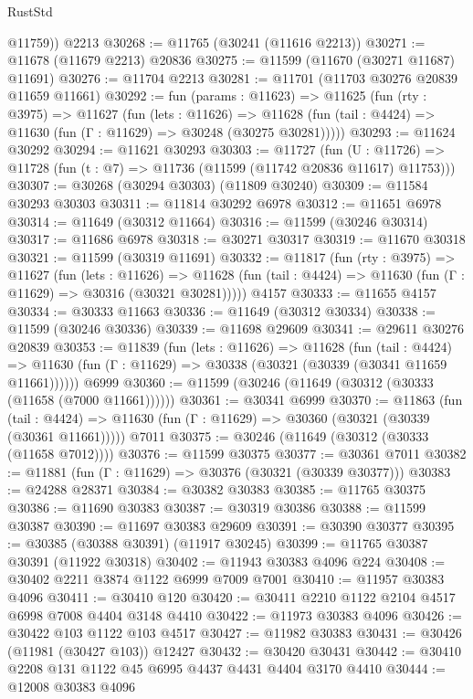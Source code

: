 \begin{lexlean}{RustStd}
\begin{coremodule}
        @11759))
    @2213
@30268 := @11765 (@30241 (@11616 @2213))
@30271 := @11678 (@11679 @2213) @20836
@30275 := @11599 (@11670 (@30271 @11687) @11691)
@30276 := @11704 @2213
@30281 := @11701 (@11703 @30276 @20839 @11659 @11661)
@30292 := fun (params : @11623) =>
  @11625
    (fun (rty : @3975) =>
    @11627
      (fun (lets : @11626) =>
      @11628 (fun (tail : @4424) => @11630 (fun (Γ : @11629) => @30248 (@30275 @30281)))))
@30293 := @11624 @30292
@30294 := @11621 @30293
@30303 := @11727
    (fun (U : @11726) => @11728 (fun (t : @7) => @11736 (@11599 (@11742 @20836 @11617) @11753)))
@30307 := @30268 (@30294 @30303) (@11809 @30240)
@30309 := @11584 @30293 @30303
@30311 := @11814 @30292 @6978
@30312 := @11651 @6978
@30314 := @11649 (@30312 @11664)
@30316 := @11599 (@30246 @30314)
@30317 := @11686 @6978
@30318 := @30271 @30317
@30319 := @11670 @30318
@30321 := @11599 (@30319 @11691)
@30332 := @11817
    (fun (rty : @3975) =>
    @11627
      (fun (lets : @11626) =>
      @11628 (fun (tail : @4424) => @11630 (fun (Γ : @11629) => @30316 (@30321 @30281)))))
    @4157
@30333 := @11655 @4157
@30334 := @30333 @11663
@30336 := @11649 (@30312 @30334)
@30338 := @11599 (@30246 @30336)
@30339 := @11698 @29609
@30341 := @29611 @30276 @20839
@30353 := @11839
    (fun (lets : @11626) =>
    @11628
      (fun (tail : @4424) =>
      @11630 (fun (Γ : @11629) => @30338 (@30321 (@30339 (@30341 @11659 @11661))))))
    @6999
@30360 := @11599 (@30246 (@11649 (@30312 (@30333 (@11658 (@7000 @11661))))))
@30361 := @30341 @6999
@30370 := @11863
    (fun (tail : @4424) => @11630 (fun (Γ : @11629) => @30360 (@30321 (@30339 (@30361 @11661)))))
    @7011
@30375 := @30246 (@11649 (@30312 (@30333 (@11658 @7012))))
@30376 := @11599 @30375
@30377 := @30361 @7011
@30382 := @11881 (fun (Γ : @11629) => @30376 (@30321 (@30339 @30377)))
@30383 := @24288 @28371
@30384 := @30382 @30383
@30385 := @11765 @30375
@30386 := @11690 @30383
@30387 := @30319 @30386
@30388 := @11599 @30387
@30390 := @11697 @30383 @29609
@30391 := @30390 @30377
@30395 := @30385 (@30388 @30391) (@11917 @30245)
@30399 := @11765 @30387 @30391 (@11922 @30318)
@30402 := @11943 @30383 @4096 @224
@30408 := @30402 @2211 @3874 @1122 @6999 @7009 @7001
@30410 := @11957 @30383 @4096
@30411 := @30410 @120
@30420 := @30411 @2210 @1122 @2104 @4517 @6998 @7008 @4404 @3148 @4410
@30422 := @11973 @30383 @4096
@30426 := @30422 @103 @1122 @103 @4517
@30427 := @11982 @30383
@30431 := @30426 (@11981 (@30427 @103)) @12427
@30432 := @30420 @30431
@30442 := @30410 @2208 @131 @1122 @45 @6995 @4437 @4431 @4404 @3170 @4410
@30444 := @12008 @30383 @4096

\end{coremodule}
\end{lexlean}
